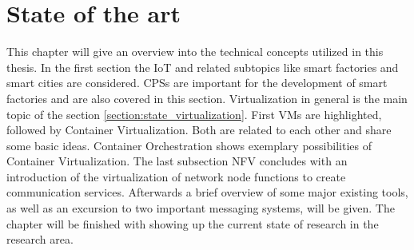 


\chapter{State of the art}
\label{chapter:state-of-the-art}
\minitoc\vspace{.5cm}

This chapter will give an overview into the technical concepts utilized in this thesis.
In the first section the \ac{IoT} and related subtopics like smart factories and smart cities are considered.
\acp{CPS} are important for the development of smart factories and are also covered in this section.
Virtualization in general is the main topic of the section \ref{section:state_virtualization}.
First \acp{VM} are highlighted, followed by Container Virtualization.
Both are related to each other and share some basic ideas.
Container Orchestration shows exemplary possibilities of Container Virtualization.
The last subsection \ac{NFV} concludes with an introduction of the virtualization of network node functions to create communication services.
Afterwards a brief overview of some major existing tools, as well as an excursion to two important messaging systems, will be given.
The chapter will be finished with showing up the current state of research in the research area.


